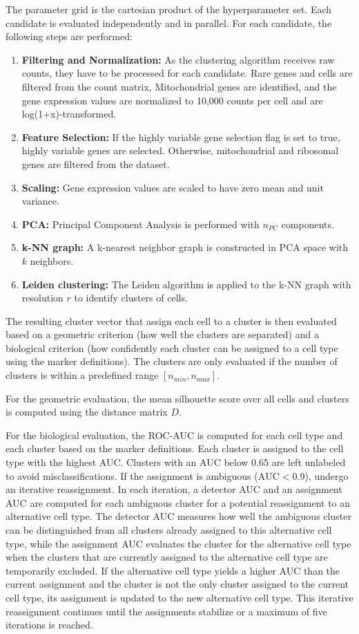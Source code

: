 \documentclass[11pt]{article}
\begin{document}
The parameter grid is the cartesian product of the hyperparameter set. Each candidate is evaluated independently and in parallel. For each candidate, the following steps are performed:
\begin{enumerate}
    \item \textbf{Filtering and Normalization:} As the clustering algorithm receives raw counts, they have to be processed for each candidate. Rare genes and cells are filtered from the count matrix, Mitochondrial genes are identified, and the gene expression values are normalized to 10,000 counts per cell and are log(1+x)-transformed.
    \item \textbf{Feature Selection:} If the highly variable gene selection flag is set to true, highly variable genes are selected. Otherwise, mitochondrial and ribosomal genes are filtered from the dataset.
    \item \textbf{Scaling:} Gene expression values are scaled to have zero mean and unit variance.
    \item \textbf{PCA:} Principal Component Analysis is performed with $n_{PC}$ components.
    \item \textbf{k-NN graph:} A k-nearest neighbor graph is constructed in PCA space with $k$ neighbors.
    \item \textbf{Leiden clustering:} The Leiden algorithm is applied to the k-NN graph with resolution $r$ to identify clusters of cells.
\end{enumerate}

The resulting cluster vector that assign each cell to a cluster is then evaluated based on a geometric criterion (how well the clusters are separated) and a biological criterion (how confidently each cluster can be assigned to a cell type using the marker definitions).
The clusters are only evaluated if the number of clusters is within a predefined range $[n_{min}, n_{max}]$.

For the geometric evaluation, the mean silhouette score over all cells and clusters is computed using the distance matrix $D$.

For the biological evaluation, the ROC-AUC is computed for each cell type and each cluster based on the marker definitions.
Each cluster is assigned to the cell type with the highest AUC. Clusters with an AUC below 0.65 are left unlabeled to avoid misclassifications. If the assignment is ambiguous ($\text{AUC}<0.9$), undergo an iterative reassignment.
In each iteration, a detector AUC and an assignment AUC are computed for each ambiguous cluster for a potential reassignment to an alternative cell type. The detector AUC measures how well the ambiguous cluster can be distinguished from all clusters already assigned to this alternative cell type, while the assignment AUC evaluates the cluster for the alternative cell type when the clusters that are currently assigned to the alternative cell type are temporarily excluded.
If the alternative cell type yields a higher AUC than the current assignment and the cluster is not the only cluster assigned to the current cell type, its assignment is updated to the new alternative cell type. This iterative reassignment continues until the assignments stabilize or a maximum of five iterations is reached.
\end{document}
